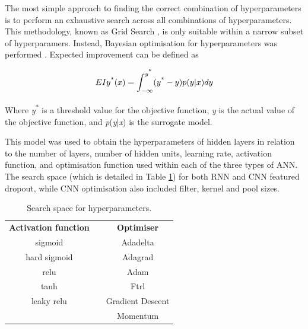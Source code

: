 





The most simple approach to finding the correct combination of hyperparameters is to perform an exhaustive search across all combinations of hyperparameters. This methodology, known as Grid Search \cite{goodfellow2016deep}, is only suitable within a narrow subset of hyperparamers. Instead, Bayesian optimisation for hyperparameters was performed \cite{snoek2012practical}. Expected improvement can be defined as


\begin{equation}
EIy\textsuperscript{*}(x) = \int_{-\infty}^{y\textsuperscript{*}}(y\textsuperscript{*} -  y)p(y|x)dy
\end{equation}

Where \textit{y}\textsuperscript{*} is a threshold value for the objective function, \textit{y} is the actual value of the objective function, and \textit{p}(\textit{y}|\textit{x}) is the surrogate model.



This model was used to obtain the hyperparameters of hidden layers in relation to the number of layers, number of hidden units, learning rate, activation function, and optimisation function used within each of the three types of ANN. The search space (which is detailed in Table \ref{table:hyperparameter-tuning}) for both RNN and CNN featured dropout, while CNN optimisation also included filter, kernel and pool sizes. 

\begin{table}[htbp]

\caption{Search space for hyperparameters.}
\begin{center}
\begin{tabular}{@{}clc@{}}
\cmidrule(r){1-1} \cmidrule(l){3-3}
\textbf{Activation function} & \textbf{} & \textbf{Optimiser} \\ \cmidrule(r){1-1} \cmidrule(l){3-3} 
sigmoid                      &           & Adadelta           \\
hard sigmoid                 &           & Adagrad            \\
relu                         &           & Adam               \\
tanh                         &           & Ftrl               \\
leaky relu                   &           & Gradient Descent   \\ \cmidrule(r){1-1}
                             &           & Momentum           \\ \cmidrule(l){3-3} 
\end{tabular}
\end{center}
\label{table:hyperparameter-tuning}
 \end{table} 

